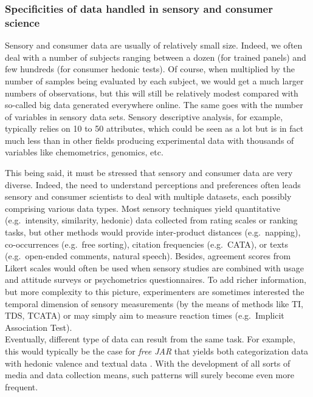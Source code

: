 \documentclass[
]{krantz}
\begin{document}
\hypertarget{specificities-of-data-handled-in-sensory-and-consumer-science}{%
\subsubsection{Specificities of data handled in sensory and consumer science}\label{specificities-of-data-handled-in-sensory-and-consumer-science}}

Sensory and consumer data are usually of relatively small size. Indeed, we often deal with a number of subjects ranging between a dozen (for trained panels) and few hundreds (for consumer hedonic tests). Of course, when multiplied by the number of samples being evaluated by each subject, we would get a much larger numbers of observations, but this will still be relatively modest compared with so-called big data generated everywhere online. The same goes with the number of variables in sensory data sets. Sensory descriptive analysis, for example, typically relies on 10 to 50 attributes, which could be seen as a lot but is in fact much less than in other fields producing experimental data with thousands of variables like chemometrics, genomics, etc.

This being said, it must be stressed that sensory and consumer data are very diverse. Indeed, the need to understand perceptions and preferences often leads sensory and consumer scientists to deal with multiple datasets, each possibly comprising various data types. Most sensory techniques yield quantitative (e.g.~intensity, similarity, hedonic) data collected from rating scales or ranking tasks, but other methods would provide inter-product distances (e.g.~napping), co-occurrences (e.g.~free sorting), citation frequencies (e.g.~CATA), or texts (e.g.~open-ended comments, natural speech). Besides, agreement scores from Likert scales would often be used when sensory studies are combined with usage and attitude surveys or psychometrics questionnaires. To add richer information, but more complexity to this picture, experimenters are sometimes interested the temporal dimension of sensory measurements (by the means of methods like TI, TDS, TCATA) or may simply aim to measure reaction times (e.g.~Implicit Association Test).\\
Eventually, different type of data can result from the same task. For example, this would typically be the case for \emph{free JAR} that yields both categorization data with hedonic valence and textual data \citep{Luc2022}. With the development of all sorts of media and data collection means, such patterns will surely become even more frequent.
\end{document}
